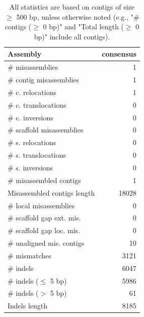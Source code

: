 \documentclass[12pt,a4paper]{article}
\begin{document}
\begin{table}[ht]
\begin{center}
\caption{All statistics are based on contigs of size $\geq$ 500 bp, unless otherwise noted (e.g., "\# contigs ($\geq$ 0 bp)" and "Total length ($\geq$ 0 bp)" include all contigs).}
\begin{tabular}{|l*{1}{|r}|}
\hline
Assembly & consensus \\ \hline
\# misassemblies & 1 \\ \hline
\hspace{2mm}\# contig misassemblies & 1 \\ \hline
\hspace{5mm}\# c. relocations & 1 \\ \hline
\hspace{5mm}\# c. translocations & 0 \\ \hline
\hspace{5mm}\# c. inversions & 0 \\ \hline
\hspace{2mm}\# scaffold misassemblies & 0 \\ \hline
\hspace{5mm}\# s. relocations & 0 \\ \hline
\hspace{5mm}\# s. translocations & 0 \\ \hline
\hspace{5mm}\# s. inversions & 0 \\ \hline
\# misassembled contigs & 1 \\ \hline
Misassembled contigs length & 18028 \\ \hline
\# local misassemblies & 0 \\ \hline
\# scaffold gap ext. mis. & 0 \\ \hline
\# scaffold gap loc. mis. & 0 \\ \hline
\# unaligned mis. contigs & 10 \\ \hline
\# mismatches & 3121 \\ \hline
\# indels & 6047 \\ \hline
\hspace{5mm}\# indels ($\leq$ 5 bp) & 5986 \\ \hline
\hspace{5mm}\# indels ($>$ 5 bp) & 61 \\ \hline
Indels length & 8185 \\ \hline
\end{tabular}
\end{center}
\end{table}
\end{document}
